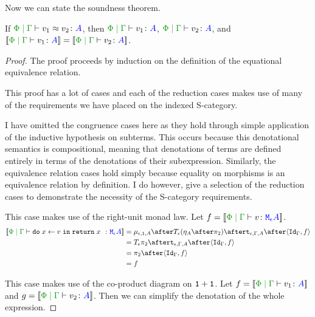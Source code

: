 Now we can state the soundness theorem. 


\begin{framed}
    \begin{theorem}[Soundness]\label{SOundness}
        If $\gpeberelation{v_1}{v_2}{A}$, then $\gpetyperelation{v_1}{A}$, $\gpetyperelation{v_2}{A}$, and $\deno{\gpetyperelation{v_1}{A}} = \deno{\gpetyperelation{v_2}{A}}$.
    \end{theorem}
    
    
    \begin{proof}
        The proof proceeds by induction on the definition of the equational equivalence relation.
    
        This proof has a lot of cases and each of the reduction cases makes use of many of the requirements we have placed on the indexed S-category.
    
        I have omitted the congruence cases here as they hold through simple application of the inductive hypothesis on subterms. This occurs because this denotational semantics is compositional, meaning that denotations of terms are defined entirely in terms of the denotations of their subexpression. Similarly, the equivalence relation cases hold simply because equality on morphisms is an equivalence relation by definition. I do however, give a selection of the reduction cases to demonstrate the necessity of the S-category requirements.
    
    \case{\eqrightunit}
    This case makes use of the right-unit monad law. Let $f = \deno{\gpetyperelation{v}{\mea}}$.
        \begin{equation}
        \begin{split}
            \deno{\gpetyperelation{\doin{x}{v}{\return{x}}}{\mea}}  & = \bind{\e}{\1}{A} \after \T{\e}{(\point{A} \after \pp)} \after \tstrength{\e}{\G}{A}\after \pr{\idg}{f} \\
            & = \T{\e}{\pp} \after \tstrength{\e}{\G}{A} \after \pr {\idg}{f} \\
            & = \pp \after \pr{\idg}{f}\\
            & = f
        \end{split}
    \end{equation}
    
    \case{\eqiftrue}
    This case makes use of the co-product diagram on $\texttt{1} + \texttt{1}$. Let $f = \deno{\gpetyperelation{v_1}{A}}$  and  $g = \deno{\gpetyperelation{v_2}{A}}$. Then we can simplify the denotation of the whole expression.
    

\end{proof}
\end{framed}
